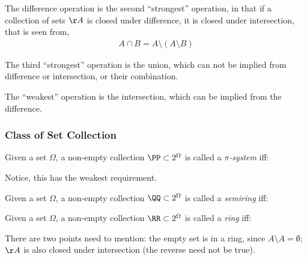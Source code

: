 The difference operation is the second ``strongest'' operation, in that if a collection of sets $\AA$ is closed under difference, it is closed under intersection, that is seen from,
\begin{align}
	A \cap B = A \setminus (A \setminus B)
\end{align}

The third ``strongest'' operation is the union, which can not be implied from difference or intersection, or their combination.

The ``weakest'' operation is the intersection, which can be implied from the difference.


\subsubsection{Class of Set Collection}
\begin{deff}
	Given a set $\Omega$, a non-empty collection $\PP \subset 2^\Omega$ is called a {\em{$\pi$-system}} iff:
	
\end{deff}
Notice, this has the weakest requirement.

\begin{deff}
	Given a set $\Omega$, a non-empty collection $\QQ \subset 2^\Omega$ is called a {\em{semiring}} iff:
	
\end{deff}

\begin{deff}
	Given a set $\Omega$, a non-empty collection $\RR \subset 2^\Omega$ is called a {\em{ring}} iff:
	
\end{deff}

There are two points need to mention: the empty set is in a ring, since $A \setminus A = \emptyset$; $\AA$ is also closed under intersection (the reverse need not be true).


